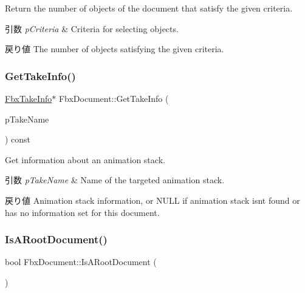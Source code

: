 Return the number of objects of the document that satisfy the given criteria. 
\begin{DoxyParams}{引数}
{\em p\+Criteria} & Criteria for selecting objects. \\
\hline
\end{DoxyParams}
\begin{DoxyReturn}{戻り値}
The number of objects satisfying the given criteria. 
\end{DoxyReturn}
\mbox{\label{class_fbx_document_aa524095dfb1dcac18f7b359070841068}} 
\subsubsection{\texorpdfstring{Get\+Take\+Info()}{GetTakeInfo()}}
{\footnotesize\ttfamily \hyperlink{class_fbx_take_info}{Fbx\+Take\+Info}$\ast$ Fbx\+Document\+::\+Get\+Take\+Info (\begin{DoxyParamCaption}\item[{const \hyperlink{class_fbx_string}{Fbx\+String} \&}]{p\+Take\+Name }\end{DoxyParamCaption}) const}

Get information about an animation stack. 
\begin{DoxyParams}{引数}
{\em p\+Take\+Name} & Name of the targeted animation stack. \\
\hline
\end{DoxyParams}
\begin{DoxyReturn}{戻り値}
Animation stack information, or {\ttfamily N\+U\+LL} if animation stack isn\textquotesingle{}t found or has no information set for this document. 
\end{DoxyReturn}
\mbox{\label{class_fbx_document_a34d240ba6a8ac2061343806431d104f9}} 
\subsubsection{\texorpdfstring{Is\+A\+Root\+Document()}{IsARootDocument()}}
{\footnotesize\ttfamily bool Fbx\+Document\+::\+Is\+A\+Root\+Document (\begin{DoxyParamCaption}\item[{void}]{ }\end{DoxyParamCaption})\hspace{0.3cm}{\ttfamily [inline]}}


